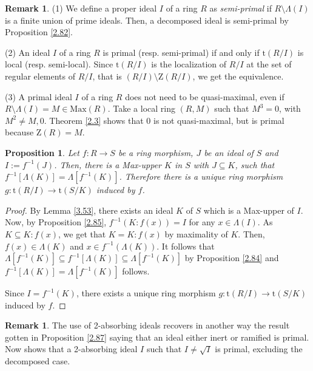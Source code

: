 \documentclass[12pt,leqno]{amsart}
\newtheorem{proposition}[theorem]{Proposition}
\theoremstyle{definition}
\newtheorem{remark}[theorem]{Remark}
\begin{document}
\begin{remark}\label{2.88}(1) We define a proper ideal $I$ of a ring $ R$ as {\it semi-primal} if $R\setminus\Lambda(I)$ is a finite union of prime ideals. Then, a decomposed ideal is semi-primal by Proposition \ref{2.82}.

(2) An ideal $I$ of a ring $R$ is  primal (resp. semi-primal)  if and only if $\mathrm{t}(R/I)$ is local (resp. semi-local). Since $\mathrm{t}(R/I)$ is the localization of $R/I$ at the set of regular elements of $R/I$, that is $(R/I)\setminus \mathrm Z(R/I)$, we get the equivalence.

(3) A primal ideal $I$ of a ring $R$ does not need to be quasi-maximal, even if $R\setminus\Lambda(I)=M\in\mathrm{Max}(R)$. Take a local ring $(R,M)$ such that $M^3=0$, with $M^2\neq M,0$. Theorem \ref{2.3} shows that $0$ is not quasi-maximal, but is primal because $\mathrm Z(R)=M$.
\end{remark}

\begin{proposition}\label{2.86} Let $f:R\to S$ be a ring morphism, $J$ be an ideal of $S$ and $I:=f^{-1}(J)$. Then, there is a Max-upper $K$ in $S$ with $J\subseteq K$, such that $f^{-1}[\Lambda(K)]=\Lambda[f^{-1}(K)]$. Therefore there is a unique ring morphism $g:\mathrm{t}(R/I)\to\mathrm{t}(S/K)$ induced by $f$.
\end{proposition}
\begin{proof} By Lemma \ref{3.53}, there exists an ideal $K$ of $S$ which is a Max-upper of $I$. Now, by Proposition \ref{2.85}, $f^{-1}(K:f(x))=I$ for any $x\in\Lambda(I)$. As $K\subseteq K:f(x)$, we get that $ K=K:f(x)$ by maximality of $K$. Then, $f(x)\in\Lambda(K)$ and $x\in f^{-1}(\Lambda(K))$. It follows that $\Lambda[f^{-1}(K)]\subseteq f^{-1}[\Lambda(K)]\subseteq\Lambda[f^{-1}(K)]$ by Proposition \ref{2.84} and $f^{-1}[\Lambda(K)]=\Lambda[f^{-1}(K)]$ follows. 

Since $I=f^{-1}(K)$, there exists a unique ring morphism $g:\mathrm{t}(R/I)\to\mathrm{t}(S/K)$ induced by $f$.
\end{proof}

\begin{remark}\label{6.1} The use of 2-absorbing ideals recovers in another way the result gotten in Proposition \ref{2.87} saying that an ideal either inert or ramified is primal. Now \cite[Corollary 2.7]{Ba} shows that a 2-absorbing ideal $I$ such that $I\neq\sqrt I$ is primal, excluding the decomposed case. 
\end{remark}
\end{document}
